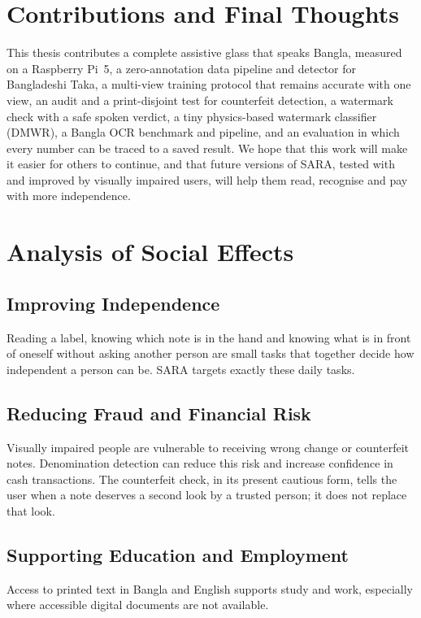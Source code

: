 \section{Contributions and Final Thoughts}
This thesis contributes a complete assistive glass that speaks Bangla, measured on a Raspberry Pi~5, a zero-annotation data pipeline and detector for Bangladeshi Taka, a multi-view training protocol that remains accurate with one view, an audit and a print-disjoint test for counterfeit detection, a watermark check with a safe spoken verdict, a tiny physics-based watermark classifier (DMWR), a Bangla OCR benchmark and pipeline, and an evaluation in which every number can be traced to a saved result. We hope that this work will make it easier for others to continue, and that future versions of SARA, tested with and improved by visually impaired users, will help them read, recognise and pay with more independence.

\section{Analysis of Social Effects}

\subsection*{Improving Independence}
Reading a label, knowing which note is in the hand and knowing what is in front of oneself without asking another person are small tasks that together decide how independent a person can be. SARA targets exactly these daily tasks.

\subsection{Reducing Fraud and Financial Risk}
Visually impaired people are vulnerable to receiving wrong change or counterfeit notes. Denomination detection can reduce this risk and increase confidence in cash transactions. The counterfeit check, in its present cautious form, tells the user when a note deserves a second look by a trusted person; it does not replace that look.

\subsection{Supporting Education and Employment}
Access to printed text in Bangla and English supports study and work, especially where accessible digital documents are not available.

